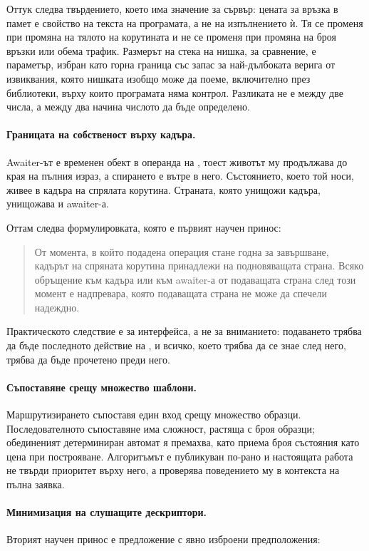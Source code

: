Оттук следва твърдението, което има значение за сървър: цената за връзка в памет е свойство
на текста на програмата, а не на изпълнението ѝ. Тя се променя при промяна на тялото на
корутината и не се променя при промяна на броя връзки или обема трафик. Размерът на стека на
нишка, за сравнение, е параметър, избран като горна граница със запас за най-дълбоката верига
от извиквания, която нишката изобщо може да поеме, включително през библиотеки, върху които
програмата няма контрол. Разликата не е между две числа, а между два начина числото да бъде
определено.

\paragraph{Границата на собственост върху кадъра.} Awaiter-ът е временен обект в операнда на
, тоест животът му продължава до края на пълния израз, а спирането е вътре в
него. Състоянието, което той носи, живее в кадъра на спрялата корутина. Страната, която
унищожи кадъра, унищожава и awaiter-а.

Оттам следва формулировката, която е първият научен принос:

\begin{quote}
От момента, в който подадена операция стане годна за завършване, кадърът на спряната
корутина принадлежи на подновяващата страна. Всяко обръщение към кадъра или към awaiter-а от
подаващата страна след този момент е надпревара, която подаващата страна не може да спечели
надеждно.
\end{quote}

Практическото следствие е за интерфейса, а не за вниманието: подаването трябва да бъде
последното действие на , и всичко, което трябва да се знае след него,
трябва да бъде прочетено преди него.

\paragraph{Съпоставяне срещу множество шаблони.} Маршрутизирането съпоставя един вход срещу
множество образци. Последователното съпоставяне има сложност, растяща с броя образци;
обединеният детерминиран автомат я премахва, като приема броя състояния като цена при
построяване. Алгоритъмът е публикуван по-рано \cite{stankov2024regex} и настоящата работа не
твърди приоритет върху него, а проверява поведението му в контекста на пълна заявка.

\paragraph{Минимизация на слушащите дескриптори.} Вторият научен принос е предложение с явно
изброени предположения:

